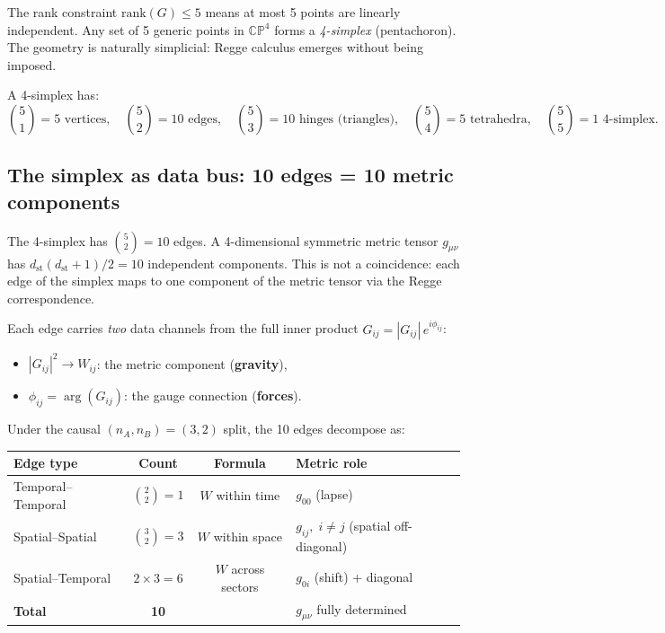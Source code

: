The rank constraint $\text{rank}(G) \leq 5$ means at most 5 points are linearly independent. Any set of 5 generic points in $\mathbb{CP}^4$ forms a \emph{4-simplex} (pentachoron). The geometry is naturally simplicial: Regge calculus emerges without being imposed.

A 4-simplex has:
\begin{equation}
\binom{5}{1} = 5 \text{ vertices}, \quad
\binom{5}{2} = 10 \text{ edges}, \quad
\binom{5}{3} = 10 \text{ hinges (triangles)}, \quad
\binom{5}{4} = 5 \text{ tetrahedra}, \quad
\binom{5}{5} = 1 \text{ 4-simplex}.
\end{equation}

\subsection{The simplex as data bus: 10 edges = 10 metric components}
\label{sec:data_bus}

The 4-simplex has $\binom{5}{2} = 10$ edges. A 4-dimensional symmetric metric tensor $g_{\mu\nu}$ has $d_\text{st}(d_\text{st}+1)/2 = 10$ independent components. This is not a coincidence: each edge of the simplex maps to one component of the metric tensor via the Regge correspondence.

Each edge carries \emph{two} data channels from the full inner product $G_{ij} = |G_{ij}|\,e^{i\phi_{ij}}$:
\begin{itemize}
\item $|G_{ij}|^2 \to W_{ij}$: the metric component (\textbf{gravity}),
\item $\phi_{ij} = \arg(G_{ij})$: the gauge connection (\textbf{forces}).
\end{itemize}

Under the causal $(n_A, n_B) = (3, 2)$ split, the 10 edges decompose as:

\begin{center}
\begin{tabular}{lccl}
\hline
Edge type & Count & Formula & Metric role \\
\hline
Temporal--Temporal & $\binom{2}{2} = 1$ & $W$ within time & $g_{00}$ (lapse) \\
Spatial--Spatial & $\binom{3}{2} = 3$ & $W$ within space & $g_{ij},\;i\neq j$ (spatial off-diagonal) \\
Spatial--Temporal & $2\times 3 = 6$ & $W$ across sectors & $g_{0i}$ (shift) + diagonal \\
\hline
\textbf{Total} & \textbf{10} & & $g_{\mu\nu}$ fully determined \\
\hline
\end{tabular}
\end{center}

